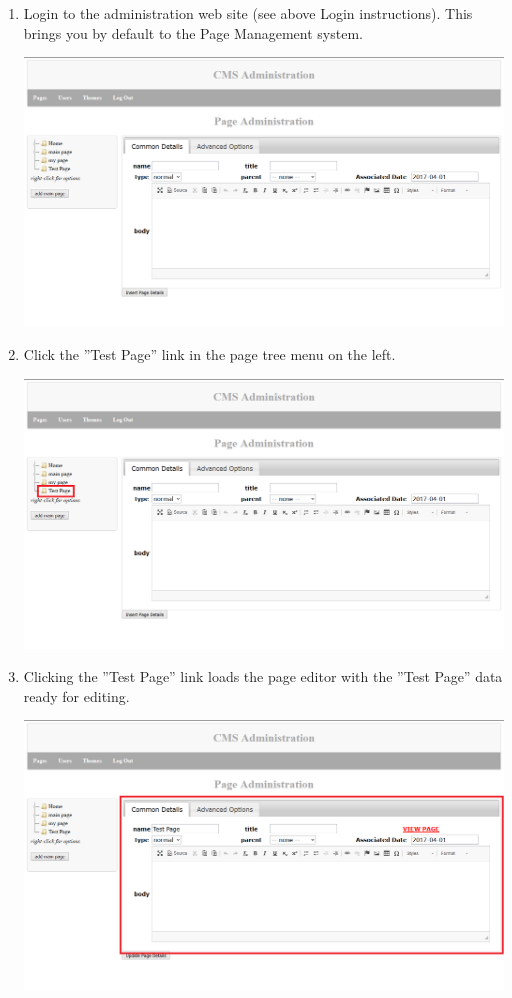 \documentclass[12pt]{article}
\begin{document}
\begin{enumerate}
  \item Login to the administration web site (see above Login instructions). This brings you by default to the Page Management system.
  
  \includegraphics[width=\textwidth,height=\textheight,keepaspectratio]{pics/editPage_1.png}
  
  \item Click the ''Test Page'' link in the page tree menu on the left.
  
  \includegraphics[width=\textwidth,height=\textheight,keepaspectratio]{pics/editPage_2.png}
  
  \item Clicking the ''Test Page'' link loads the page editor with the ''Test Page'' data ready for editing.
  
  \includegraphics[width=\textwidth,height=\textheight,keepaspectratio]{pics/editPage_3.png}
  

\end{enumerate}
\end{document}

